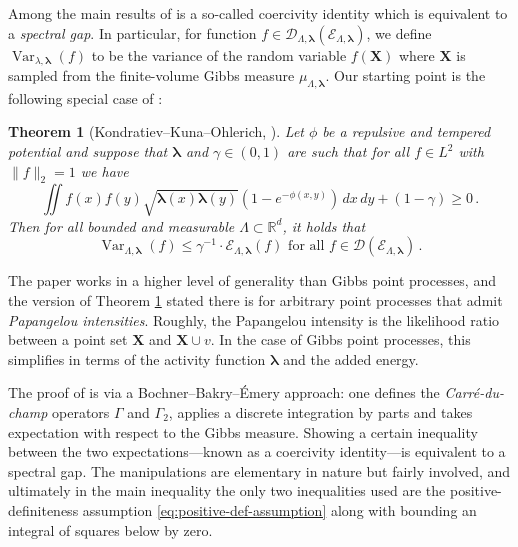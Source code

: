 \documentclass[10pt]{amsart}
\newtheorem{theorem}{Theorem}[section]
\theoremstyle{definition}
\theoremstyle{remark}
\newcommand{\dirichlet}{\mathcal{E}}
\newcommand{\bX}{\mathbf{X}}
\newcommand{\blambda}{{\boldsymbol{\lambda}}}
\newcommand{\R}{\mathbb{R}}
\newcommand{\Var}{{\operatorname{Var}}}
\begin{document}
	Among the main results of \cite{kondratiev2013spectral} is a so-called coercivity identity which is equivalent to a \emph{spectral gap}.  In particular, for function $f \in \mathcal{D}_{\Lambda,\blambda}(\dirichlet_{\Lambda,\blambda})$, we define $\Var_{\lambda,\blambda}(f)$ to be the variance of the random variable $f(\bX)$ where $\bX$ is sampled from the finite-volume Gibbs measure $\mu_{\Lambda,\blambda}$.  Our starting point is the following special case of \cite[Theorem~3.4]{kondratiev2013spectral}:
	
	\begin{theorem}[Kondratiev--Kuna--Ohlerich, \cite{kondratiev2013spectral}] \label{thm:Kondratiev}
		Let $\phi$ be a repulsive and tempered potential and suppose that $\blambda$  and $\gamma \in (0,1)$ are such that for all $f \in L^2$ with $\|f \|_2 = 1$ we have
		\begin{equation}\label{eq:positive-def-assumption}
			\iint f(x) f(y) \sqrt{\blambda(x) \blambda(y)} (1 - e^{-\phi(x,y)}) \,dx\,dy + (1 - \gamma) \geq 0\,.
		\end{equation}
		Then for all bounded and  measurable $\Lambda \subset \R^d$, it holds that \begin{equation}\label{eq:spectral-gap}
			\Var_{\Lambda,\blambda}(f) \leq \gamma^{-1} \cdot \mathcal{E}_{\Lambda,\blambda}(f) \text{ for all }f \in \mathcal{D}(\mathcal{E}_{\Lambda,\blambda})\,.\end{equation}
	\end{theorem}
	
	
	The paper \cite{kondratiev2013spectral} works in a higher level of generality than Gibbs point processes, and the version of Theorem \ref{thm:Kondratiev} stated there is for arbitrary point processes that admit \emph{Papangelou intensities}.  Roughly, the Papangelou intensity is the likelihood ratio between a point set $\bX$ and $\bX \cup v$. In the case of Gibbs point processes, this simplifies in terms of the activity function $\blambda$ and the added energy.  
	
	The proof of \cite{kondratiev2013spectral} is via a Bochner--Bakry--\'Emery approach: one defines the \emph{Carr\'e-du-champ} operators $\Gamma$ and $\Gamma_2$, applies a discrete integration by parts and takes expectation with respect to the Gibbs measure.  Showing a certain inequality between the two expectations---known as a coercivity identity---is equivalent to a spectral gap.  The manipulations are elementary in nature but fairly involved, and ultimately in the main inequality the only two inequalities used are the positive-definiteness assumption \eqref{eq:positive-def-assumption} along with bounding an integral of squares below by zero. 
	
\end{document}
